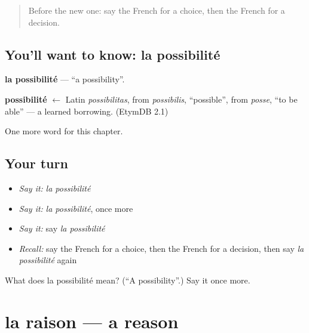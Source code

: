 \label{lesson:FR-C225-possibilite}



\begin{quote}
Before the new one: say the French for a choice, then the French for a decision.
\end{quote}

\subsection*{You'll want to know: la possibilité}
\textbf{la possibilité} — \textquotedblleft{}a possibility\textquotedblright{}.

\begin{cousinweb}
\textbf{possibilité} $\leftarrow$ Latin \emph{possibilitas}, from \emph{possibilis}, \textquotedblleft{}possible\textquotedblright{}, from \emph{posse}, \textquotedblleft{}to be able\textquotedblright{} — a learned borrowing. (EtymDB 2.1)
\end{cousinweb}

\begin{grammarlens}[title={What you've built}]
One more word for this chapter.
\end{grammarlens}

\subsection*{Your turn}
\begin{itemize}
\raggedright
  \item \emph{Say it:} \emph{la possibilité}
  \item \emph{Say it:} \emph{la possibilité}, once more
  \item \emph{Say it:} say \emph{la possibilité}
  \item \emph{Recall:} say the French for a choice, then the French for a decision, then say \emph{la possibilité} again
\end{itemize}

\begin{tcolorbox}[breakable,colback=teal!4,colframe=teal!35!black,title={Before you move on}]
What does la possibilité mean? (\textquotedblleft{}A possibility\textquotedblright{}.) Say it once more.
\end{tcolorbox}
\section[la raison]{la raison — a reason}

